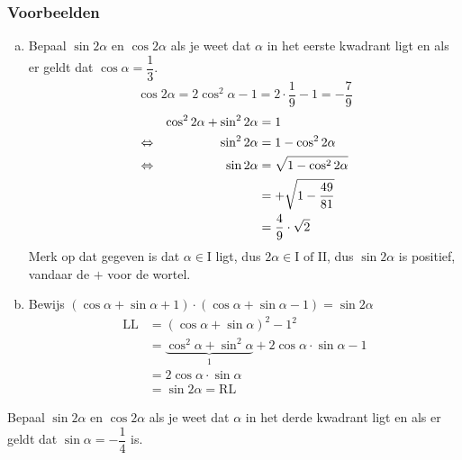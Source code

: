 \documentclass[a4paper,12pt]{article}
\begin{document}
\begin{theorie}
\subsubsection*{Voorbeelden}
\begin{enumerate}[(a)]
  \item Bepaal $\sin 2\alpha$ en $\cos 2\alpha$ als je weet dat $\alpha$ in het eerste kwadrant ligt en als er geldt dat $\cos\alpha=\dfrac{1}{3}$.
    $$\cos 2\alpha = 2\cos^2\alpha - 1 = 2\cdot \dfrac{1}{9}-1=-\dfrac{7}{9}$$
    \begin{align*}
           && \cos^2 2\alpha + \sin^2 2\alpha &= 1\\
      \Leftrightarrow &&                  \sin^2 2\alpha &= 1 - \cos^2 2\alpha\\
      \Leftrightarrow &&                  \sin 2\alpha   &= \sqrt{1 - \cos^2 2\alpha}\\
           &&                                 &= + \sqrt{1 - \dfrac{49}{81}}\\
           &&                                 &= \dfrac{4}{9}\cdot\sqrt{2}
    \end{align*}
    Merk op dat gegeven is dat $\alpha\in\mbox{I}$ ligt, dus $2\alpha\in\mbox{I of II}$, dus $\sin 2\alpha$ is positief, vandaar de $+$ voor de wortel.
    \item Bewijs $(\cos \alpha + \sin \alpha + 1)\cdot(\cos\alpha + \sin\alpha - 1)=\sin 2\alpha$
    \begin{align*}
      \mbox{LL} &= (\cos\alpha + \sin\alpha)^2 - 1^2\\
                &= \underbrace{\cos^2\alpha + \sin^2\alpha}_1 + 2\cos\alpha\cdot\sin\alpha - 1\\
                &= 2\cos\alpha\cdot\sin\alpha\\
                &= \sin 2\alpha = \mbox{RL}
    \end{align*}
\end{enumerate}

\end{theorie}

\begin{oefening}
Bepaal $\sin 2\alpha$ en $\cos 2\alpha$ als je weet dat $\alpha$ in het derde kwadrant ligt en als er geldt dat $\sin\alpha=-\dfrac{1}{4}$ is.
\end{oefening}
\end{document}
